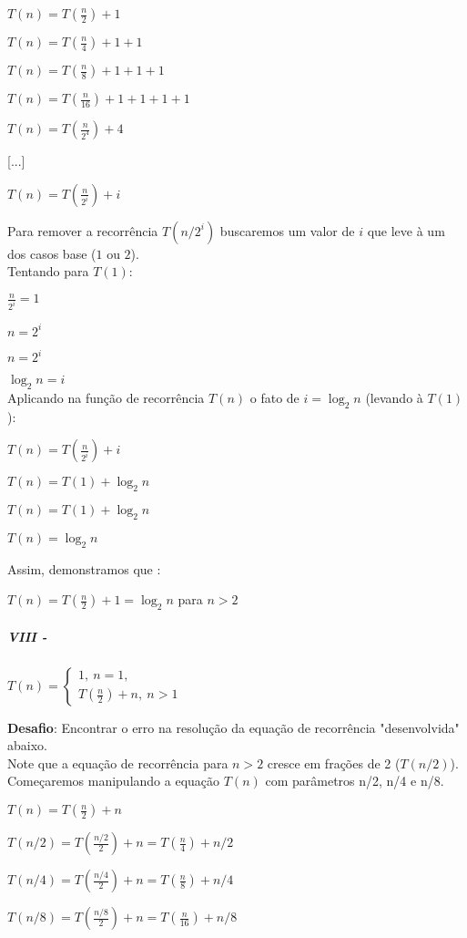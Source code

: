 \documentclass[a4paper, twocolumn]{article}
\theoremstyle{definition}
\begin{document}
$T(n) = T(\frac{n}{2}) + 1$

$T(n) = T(\frac{n}{4}) + 1 + 1$

$T(n) = T(\frac{n}{8}) + 1 + 1 + 1$

$T(n) = T(\frac{n}{16}) + 1 + 1 + 1 + 1$

$T(n) = T(\frac{n}{2^4}) + 4$

[...]

$T(n) = T(\frac{n}{2^i}) + i$

Para remover a recorrência $T(n/2^i)$ buscaremos um valor de $i$ que leve à um dos casos base ($1$ ou $2$). \\

Tentando para $T(1)$:

$\frac{n}{2^i} = 1$

$n = 2^i$

$n = 2^i$

$\log_2 n = i$ \\

Aplicando na função de recorrência $T(n)$ o fato de $i = \log_2 n$ (levando à $T(1)$):

$T(n) = T(\frac{n}{2^i}) + i$

$T(n) = T(1) + \log_2 n$

$T(n) = T(1) + \log_2 n$

$T(n) = \log_2 n$

Assim, demonstramos que :

$T(n) = T(\frac{n}{2}) + 1 =\log_2 n$ para $n > 2$

\subparagraph{VIII - } {$T(n) = \begin{cases} 
		1,\ n = 1, \\
		T(\frac{n}{2}) + n, \ n > 1
	\end{cases}$}

\textbf{Desafio}: Encontrar o erro na resolução da equação de recorrência "desenvolvida" abaixo. \\

Note que a equação de recorrência para $n>2$ cresce em frações de 2 ($T(n/2)$). Começaremos manipulando a equação $T(n)$ com parâmetros n/2, n/4 e n/8.

$T(n) = T(\frac{n}{2}) + n$

$T(n/2) = T(\frac{n/2}{2}) + n = T(\frac{n}{4}) + n/2$

$T(n/4) = T(\frac{n/4}{2}) + n = T(\frac{n}{8}) + n/4$

$T(n/8) = T(\frac{n/8}{2}) + n = T(\frac{n}{16}) + n/8$ \\
\end{document}
